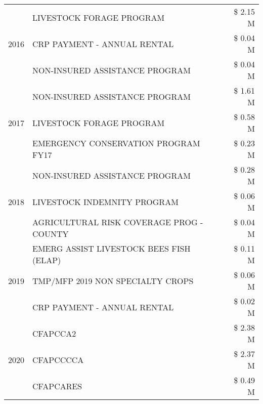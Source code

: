 \begin{tabular}{llr}
\cline{1-3}
\multirow[t]{3}{*}{2016} & LIVESTOCK FORAGE PROGRAM & \$ 2.15 M \\
 & CRP PAYMENT - ANNUAL RENTAL & \$ 0.04 M \\
 & NON-INSURED ASSISTANCE PROGRAM & \$ 0.04 M \\
\cline{1-3}
\multirow[t]{3}{*}{2017} & NON-INSURED ASSISTANCE PROGRAM & \$ 1.61 M \\
 & LIVESTOCK FORAGE PROGRAM & \$ 0.58 M \\
 & EMERGENCY CONSERVATION PROGRAM FY17 & \$ 0.23 M \\
\cline{1-3}
\multirow[t]{3}{*}{2018} & NON-INSURED ASSISTANCE PROGRAM & \$ 0.28 M \\
 & LIVESTOCK INDEMNITY PROGRAM & \$ 0.06 M \\
 & AGRICULTURAL RISK COVERAGE PROG - COUNTY & \$ 0.04 M \\
\cline{1-3}
\multirow[t]{3}{*}{2019} & EMERG ASSIST LIVESTOCK BEES FISH (ELAP) & \$ 0.11 M \\
 & TMP/MFP 2019 NON SPECIALTY CROPS & \$ 0.06 M \\
 & CRP PAYMENT - ANNUAL RENTAL & \$ 0.02 M \\
\cline{1-3}
\multirow[t]{3}{*}{2020} & CFAPCCA2 & \$ 2.38 M \\
 & CFAPCCCCA & \$ 2.37 M \\
 & CFAPCARES & \$ 0.49 M \\
\cline{1-3}
\bottomrule
\end{tabular}
